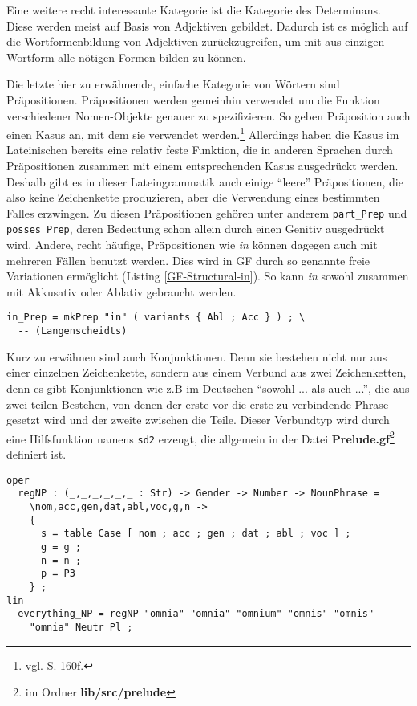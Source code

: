 Eine weitere recht interessante Kategorie ist die Kategorie des Determinans. Diese werden meist auf Basis von Adjektiven gebildet. Dadurch ist es möglich auf die Wortformenbildung von Adjektiven zurückzugreifen, um mit aus einzigen Wortform alle nötigen Formen bilden zu können. \par
Die letzte hier zu erwähnende, einfache Kategorie von Wörtern sind Präpositionen. Präpositionen werden gemeinhin verwendet um die Funktion verschiedener Nomen-Objekte genauer zu spezifizieren. So geben Präposition auch einen Kasus an, mit dem sie verwendet werden.\footnote{vgl. \cite{BAYER-LINDAUER1994} S. 160f.} Allerdings haben die Kasus im Lateinischen bereits eine relativ feste Funktion, die in anderen Sprachen durch Präpositionen zusammen mit einem entsprechenden Kasus ausgedrückt werden. Deshalb gibt es in dieser Lateingrammatik auch einige "`leere"' Präpositionen, die also keine Zeichenkette produzieren, aber die Verwendung eines bestimmten Falles erzwingen. Zu diesen Präpositionen gehören unter anderem \texttt{part\_Prep} und \texttt{posses\_Prep}, deren Bedeutung schon allein durch einen Genitiv ausgedrückt wird. Andere, recht häufige, Präpositionen wie \textit{in} können dagegen auch mit mehreren Fällen benutzt werden. Dies wird in GF durch so genannte freie Variationen ermöglicht (Listing \ref{GF-Structural-in}). So kann \textit{in} sowohl zusammen mit Akkusativ oder Ablativ gebraucht werden.
\begin{lstlisting}[float=h!tp,label={GF-Structural-in},caption={Beispiel für freie Variation (vgl. \textbf{StructuralLat.gf})}]
in_Prep = mkPrep "in" ( variants { Abl ; Acc } ) ; \
  -- (Langenscheidts)
\end{lstlisting}
Kurz zu erwähnen sind auch Konjunktionen. Denn sie bestehen nicht nur aus einer einzelnen Zeichenkette, sondern aus einem Verbund aus zwei Zeichenketten, denn es gibt Konjunktionen wie z.B im Deutschen ``sowohl ... als auch ...'', die aus zwei teilen Bestehen, von denen der erste vor die erste zu verbindende Phrase gesetzt wird und der zweite zwischen die Teile. Dieser Verbundtyp wird durch eine Hilfsfunktion namens \texttt{sd2} erzeugt, die allgemein in der Datei \textbf{Prelude.gf}\footnote{im Ordner \textbf{lib/src/prelude}} definiert ist. \par
\begin{lstlisting}[float=h!tp,caption={Erzeugung des \texttt{NP}-Objekts für \texttt{everything\_NP} (vgl. \textbf{ResLat.gf} und \textbf{StructuralLat.gf})},label={GF-Structural-Everything},basicstyle=\small]
oper
  regNP : (_,_,_,_,_,_ : Str) -> Gender -> Number -> NounPhrase = 
    \nom,acc,gen,dat,abl,voc,g,n ->
    {
      s = table Case [ nom ; acc ; gen ; dat ; abl ; voc ] ;
      g = g ;
      n = n ;
      p = P3 
    } ;
lin
  everything_NP = regNP "omnia" "omnia" "omnium" "omnis" "omnis"
    "omnia" Neutr Pl ; 
\end{lstlisting}
